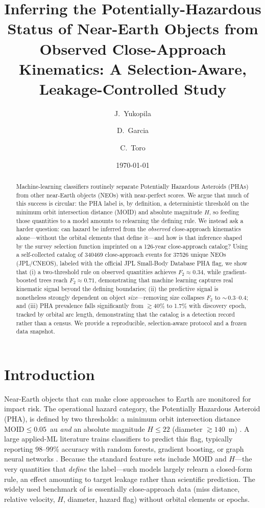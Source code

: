 \documentclass[11pt]{article}
\title{Inferring the Potentially-Hazardous Status of Near-Earth Objects from
Observed Close-Approach Kinematics: A Selection-Aware, Leakage-Controlled Study}
\author{J.\ Yukopila \and D.\ Garcia \and C.\ Toro}
\date{\today}
\begin{document}
\maketitle

\begin{abstract}
Machine-learning classifiers routinely separate Potentially Hazardous Asteroids
(PHAs) from other near-Earth objects (NEOs) with near-perfect scores. We argue that
much of this success is circular: the PHA label is, by definition, a deterministic
threshold on the minimum orbit intersection distance (MOID) and absolute magnitude
$H$, so feeding those quantities to a model amounts to relearning the defining rule.
We instead ask a harder question: can hazard be inferred from the \emph{observed}
close-approach kinematics alone---without the orbital elements that define it---and
how is that inference shaped by the survey selection function imprinted on a
126-year close-approach catalog? Using a self-collected catalog of
\num{340469} close-approach events for \num{37526} unique NEOs (JPL/CNEOS), labeled
with the official JPL Small-Body Database PHA flag, we show that (i) a two-threshold
rule on observed quantities achieves $F_2 \approx 0.34$, while gradient-boosted trees
reach $F_2 \approx 0.71$, demonstrating that machine learning captures real kinematic signal
beyond the defining boundaries; (ii) the predictive signal is nonetheless strongly dependent
on object \emph{size}---removing size collapses $F_2$ to
$\sim$\,0.3--0.4; and (iii) PHA prevalence falls significantly from $\gtrsim$40\% to
1.7\% with discovery epoch, tracked by orbital arc length, demonstrating that the
catalog is a detection record rather than a census. We provide a reproducible,
selection-aware protocol and a frozen data snapshot.
\end{abstract}

\section{Introduction}
Near-Earth objects that can make close approaches to Earth are monitored for impact
risk. The operational hazard category, the Potentially Hazardous Asteroid (PHA), is
defined by two thresholds: a minimum orbit intersection distance $\mathrm{MOID}\le
0.05$~au \emph{and} an absolute magnitude $H\le 22$ (diameter $\gtrsim 140$~m)
\citep{cneos_pha}. A large applied-ML literature trains classifiers to predict this
flag, typically reporting 98--99\% accuracy with random forests, gradient boosting,
or graph neural networks \citep{neo_resampling2025,neo_gnn2025,neo_xai2025}. Because
the standard feature sets include MOID and $H$---the very quantities that
\emph{define} the label---such models largely relearn a closed-form rule, an effect
amounting to target leakage rather than scientific prediction. The widely used
benchmark of \citet{kaggle_neo} is essentially close-approach data (miss distance,
relative velocity, $H$, diameter, hazard flag) without orbital elements or epochs.
\end{document}
